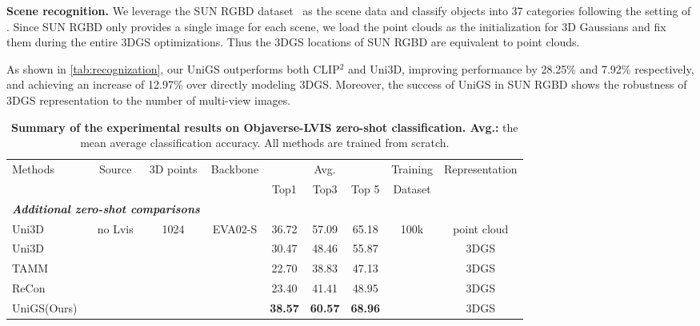 \textbf{Scene recognition.} We leverage the SUN RGBD dataset~\citep{song2015sun} as the scene data and classify objects into 37 categories following the setting of \citep{song2015sun}. Since SUN RGBD only provides a single image for each scene, we load the point clouds as the initialization for 3D Gaussians and fix them during the entire 3DGS optimizations. Thus the 3DGS locations of SUN RGBD are equivalent to point clouds.

As shown in \cref{tab:recognization}, our UniGS outperforms both CLIP$^2$ and Uni3D, improving performance by 28.25\% and 7.92\% respectively, and achieving an increase of 12.97\% over directly modeling 3DGS. Moreover, the success of UniGS in SUN RGBD shows the robustness of 3DGS representation to the number of multi-view images.

\begin{table*}[t]
		\centering
  \setlength{\tabcolsep}{3pt}
 \begin{tabularx}{\textwidth}{ l | c c c | c c c | c c }
\toprule
\multirow{2}{*}{Methods} & \multirow{2}{*}{Source} & \multirow{2}{*}{3D points} & \multirow{2}{*}{Backbone}  & \multicolumn{3}{c|}{Avg.} & Training & \multirow{2}{*}{Representation} \\
  & & & & Top1 & Top3 & Top 5 & Dataset & \\
  
 \midrule  \midrule
    \multicolumn{3}{l}{\textit{\textbf{Additional zero-shot comparisons}}} \\
    \midrule
Uni3D & \multirow{5}{*}{no Lvis} & \multirow{5}{*}{1024} & \multirow{5}{*}{EVA02-S} & 36.72 & 57.09 & 65.18 & \multirow{5}{*}{100k}  & point cloud\\
Uni3D & & & & 30.47 & 48.46 & 55.87	 & & 3DGS \\
TAMM & & & & 22.70 & 38.83 & 47.13	 & &  3DGS\\
ReCon & & & & 23.40 & 41.41 & 48.95	 & & 3DGS \\
UniGS(Ours) & & & & \textbf{38.57} & \textbf{60.57} & \textbf{68.96} & & 3DGS \\

\bottomrule
\end{tabularx}
    \vspace{-1mm}
		\caption{\textbf{Summary of the experimental results on Objaverse-LVIS zero-shot classification. Avg.: }the mean average classification accuracy. All methods are trained from scratch.}
  \label{tab:further_comparsions_to_sota}
  \vspace{-3mm}
\end{table*}

